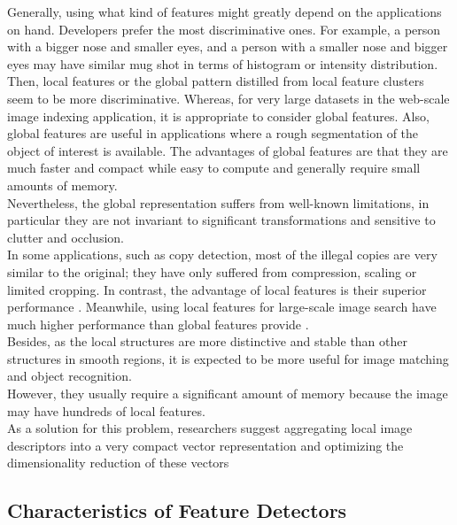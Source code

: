 Generally, using what kind of features might greatly depend on the applications
on hand. Developers prefer the most discriminative ones. For example, a person with
a bigger nose and smaller eyes, and a person with a smaller nose and bigger eyes
may have similar mug shot in terms of histogram or intensity distribution. Then, local
features or the global pattern distilled from local feature clusters seem to be more
discriminative. Whereas, for very large datasets in the web-scale image indexing
application, it is appropriate to consider global features. Also, global features are
useful in applications where a rough segmentation of the object of interest is available.
The advantages of global features are that they are much faster and compact
while easy to compute and generally require small amounts of memory.\\ Nevertheless,
the global representation suffers from well-known limitations, in particular they
are not invariant to significant transformations and sensitive to clutter and occlusion.\\In some applications, such as copy detection, most of the illegal copies are very  similar to the original; they have only suffered from compression, scaling or limited
cropping. In contrast, the advantage of local features is their superior performance \cite{i}. Meanwhile, using local features for large-scale image search have much higher performance than global features provide \cite{k}.\\ Besides, as the local structures are more distinctive and stable than other structures in smooth regions, it is expected to be more useful for image matching and object recognition.\\ However, they usually require a significant amount of memory because the image may have hundreds of local features.\\ As a solution for this problem, researchers suggest aggregating local image descriptors into a very compact vector representation and optimizing the
dimensionality reduction of these vectors \cite{k}


\subsection{Characteristics of Feature Detectors}

